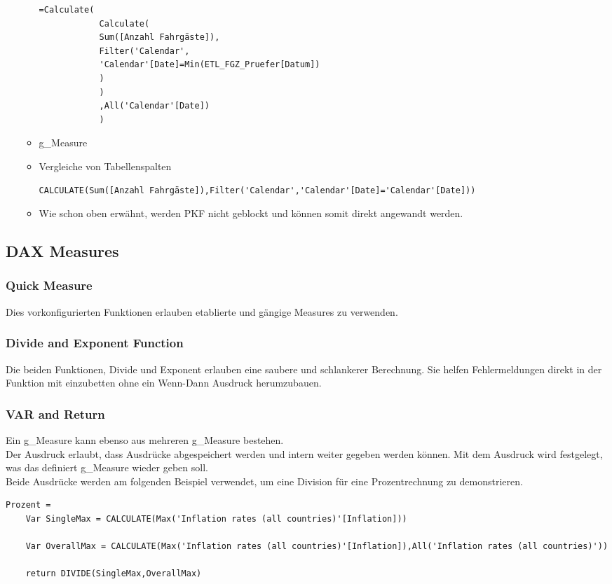 \begin{itemize}
\begin{itemize}
\begin{lstlisting}[style=DAX]
			=Calculate(
			Calculate(
			Sum([Anzahl Fahrgäste]),
			Filter('Calendar',
			'Calendar'[Date]=Min(ETL_FGZ_Pruefer[Datum])
			)
			)
			,All('Calendar'[Date])
			)
		\end{lstlisting}
		\item \gls{g_Measure}
		\item Vergleiche von Tabellenspalten
		\begin{lstlisting}[style=DAX]
			CALCULATE(Sum([Anzahl Fahrgäste]),Filter('Calendar','Calendar'[Date]='Calendar'[Date]))
		\end{lstlisting}
		\item Wie schon oben erwähnt, werden \gls{PKF} nicht geblockt und können somit direkt angewandt werden.
	\end{itemize}
\end{itemize}
\subsection{DAX Measures}

\subsubsection{Quick Measure}
Dies vorkonfigurierten Funktionen erlauben etablierte und gängige Measures zu verwenden.
\subsubsection{Divide and Exponent Function}
Die beiden Funktionen, Divide und Exponent erlauben eine saubere und schlankerer Berechnung. Sie helfen Fehlermeldungen direkt in der Funktion mit einzubetten ohne ein Wenn-Dann Ausdruck herumzubauen.

\subsubsection{VAR and Return}
Ein \gls{g_Measure} kann ebenso aus mehreren \gls{g_Measure} bestehen. \\

Der Ausdruck  erlaubt, dass Ausdrücke abgespeichert werden und intern weiter gegeben werden können.
Mit dem Ausdruck  wird festgelegt, was das definiert \gls{g_Measure} wieder geben soll.\\

Beide Ausdrücke werden am folgenden Beispiel verwendet, um eine Division für eine Prozentrechnung zu demonstrieren.
\begin{lstlisting}[style=DAX]
Prozent = 
	Var SingleMax = CALCULATE(Max('Inflation rates (all countries)'[Inflation]))
	
	Var OverallMax = CALCULATE(Max('Inflation rates (all countries)'[Inflation]),All('Inflation rates (all countries)'))
	
	return DIVIDE(SingleMax,OverallMax)
\end{lstlisting}

